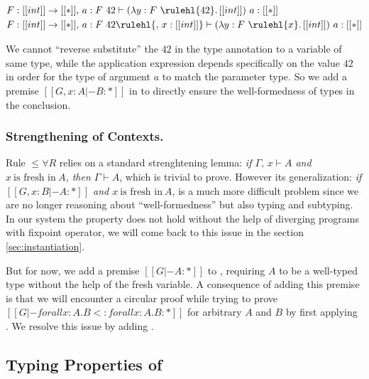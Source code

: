 \begin{align*}
& F : [[int]] \rightarrow [[*]],\, a : F~42  \vdash (\lambda y : F~\rulehl{42}.\, [[int]]) ~ a : [[*]] \\
& F : [[int]] \rightarrow [[*]],\, a : F~42  \rulehl{,\, x : [[int]]} \vdash (\lambda y : F~\rulehl{x}.\, [[int]]) ~ a : [[*]]
\end{align*}

We cannot ``reverse substitute'' the $42$ in the type annotation to a variable
of same type, while the application expression depends specifically on the value
$42$ in order for the type of argument $a$ to match the parameter type.
So we add a premise $[[G , x : A |- B : *]]$ in  to directly
ensure the well-formedness of types in the conclusion.

\subsubsection{Strengthening of Contexts.}

Rule $\le\forall R$ relies on a standard strenghtening lemma:
\emph{if $\Gamma,\, x \vdash A$ and $x ~\text{is fresh in}~ A$, then $\Gamma \vdash A$}, which
is trivial to prove.
However its generalization:
\emph{if $[[G, x : B |- A : *]]$ and $x ~\text{is fresh in}~ A$},
is a much more difficult problem since we are no longer reasoning about
``well-formedness'' but also typing and subtyping. In our system the property
does not hold without the help of diverging programs with fixpoint operator,
we will come back to this issue in the section \ref{sec:instantiation}.

But for now, we add a premise $[[G |- A : *]]$ to ,
requiring $A$ to be a well-typed type without the help of the fresh variable.
A consequence of adding this premise is that we will encounter a circular proof
while trying to prove $[[G |- forall x : A. B <: forall x : A . B : *]]$ for
arbitrary $A$ and $B$ by first applying . We resolve this issue by
adding .

\subsection{Typing Properties of \name}

